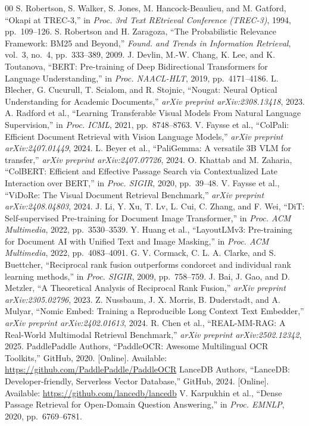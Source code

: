 \documentclass[conference]{IEEEtran}
\begin{document}
\begin{thebibliography}{00}
 S. Robertson, S. Walker, S. Jones, M. Hancock-Beaulieu, and M. Gatford, ``Okapi at TREC-3,'' in \textit{Proc. 3rd Text REtrieval Conference (TREC-3)}, 1994, pp.~109--126.
 S. Robertson and H. Zaragoza, ``The Probabilistic Relevance Framework: BM25 and Beyond,'' \textit{Found. and Trends in Information Retrieval}, vol.~3, no.~4, pp.~333--389, 2009.
 J. Devlin, M.-W. Chang, K. Lee, and K. Toutanova, ``BERT: Pre-training of Deep Bidirectional Transformers for Language Understanding,'' in \textit{Proc. NAACL-HLT}, 2019, pp.~4171--4186.
 L. Blecher, G. Cucurull, T. Scialom, and R. Stojnic, ``Nougat: Neural Optical Understanding for Academic Documents,'' \textit{arXiv preprint arXiv:2308.13418}, 2023.
 A. Radford et al., ``Learning Transferable Visual Models From Natural Language Supervision,'' in \textit{Proc. ICML}, 2021, pp.~8748--8763.
 V. Faysse et al., ``ColPali: Efficient Document Retrieval with Vision Language Models,'' \textit{arXiv preprint arXiv:2407.01449}, 2024.
 L. Beyer et al., ``PaliGemma: A versatile 3B VLM for transfer,'' \textit{arXiv preprint arXiv:2407.07726}, 2024.
 O. Khattab and M. Zaharia, ``ColBERT: Efficient and Effective Passage Search via Contextualized Late Interaction over BERT,'' in \textit{Proc. SIGIR}, 2020, pp.~39--48.
 V. Faysse et al., ``ViDoRe: The Visual Document Retrieval Benchmark,'' \textit{arXiv preprint arXiv:2408.04803}, 2024.
 J. Li, Y. Xu, T. Lv, L. Cui, C. Zhang, and F. Wei, ``DiT: Self-supervised Pre-training for Document Image Transformer,'' in \textit{Proc. ACM Multimedia}, 2022, pp.~3530--3539.
 Y. Huang et al., ``LayoutLMv3: Pre-training for Document AI with Unified Text and Image Masking,'' in \textit{Proc. ACM Multimedia}, 2022, pp.~4083--4091.
 G. V. Cormack, C. L. A. Clarke, and S. Buettcher, ``Reciprocal rank fusion outperforms condorcet and individual rank learning methods,'' in \textit{Proc. SIGIR}, 2009, pp.~758--759.
 J. Bai, J. Gao, and D. Metzler, ``A Theoretical Analysis of Reciprocal Rank Fusion,'' \textit{arXiv preprint arXiv:2305.02796}, 2023.
 Z. Nussbaum, J. X. Morris, B. Duderstadt, and A. Mulyar, ``Nomic Embed: Training a Reproducible Long Context Text Embedder,'' \textit{arXiv preprint arXiv:2402.01613}, 2024.
 R. Chen et al., ``REAL-MM-RAG: A Real-World Multimodal Retrieval Benchmark,'' \textit{arXiv preprint arXiv:2502.12342}, 2025.
 PaddlePaddle Authors, ``PaddleOCR: Awesome Multilingual OCR Toolkits,'' GitHub, 2020. [Online]. Available: \url{https://github.com/PaddlePaddle/PaddleOCR}
 LanceDB Authors, ``LanceDB: Developer-friendly, Serverless Vector Database,'' GitHub, 2024. [Online]. Available: \url{https://github.com/lancedb/lancedb}
 V. Karpukhin et al., ``Dense Passage Retrieval for Open-Domain Question Answering,'' in \textit{Proc. EMNLP}, 2020, pp.~6769--6781.
\end{thebibliography}
 
\end{document}
